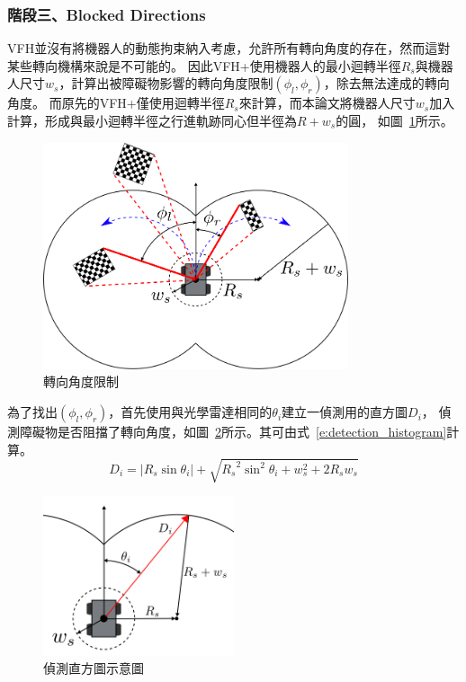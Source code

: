 \subsubsection{階段三、Blocked Directions}
VFH並沒有將機器人的動態拘束納入考慮，允許所有轉向角度的存在，然而這對某些轉向機構來說是不可能的。
因此VFH+使用機器人的最小迴轉半徑$R_s$與機器人尺寸$w_s$，計算出被障礙物影響的轉向角度限制$(\phi_l,\phi_r)$，除去無法達成的轉向角度。
而原先的VFH+僅使用迴轉半徑$R_s$來計算，而本論文將機器人尺寸$w_s$加入計算，形成與最小迴轉半徑之行進軌跡同心但半徑為$R+w_s$的圓，
如圖~\ref{f:block_directions}所示。
\begin{figure}[h!]
	\centering
	\includegraphics[width=0.8\textwidth]{figures/algorithm/blocked_directions}
	\caption{轉向角度限制}
	\label{f:block_directions}
\end{figure}

為了找出$(\phi_l,\phi_r)$，首先使用與光學雷達相同的$\theta_i$建立一偵測用的直方圖$D_i$，
偵測障礙物是否阻擋了轉向角度，如圖~\ref{f:detection_histogram}所示。其可由式~\ref{e:detection_histogram}計算。
\begin{equation}
	D_i = |R_s\sin\theta_i| + \sqrt{{R_s}^2\sin^2\theta_i + w_s^2 + 2 R_s w_s}
	\label{e:detection_histogram}
\end{equation}
\begin{figure}[h!]
	\centering
	\includegraphics[width=0.5\textwidth]{figures/algorithm/detection_histogram}
	\caption{偵測直方圖示意圖}
	\label{f:detection_histogram}
\end{figure}

